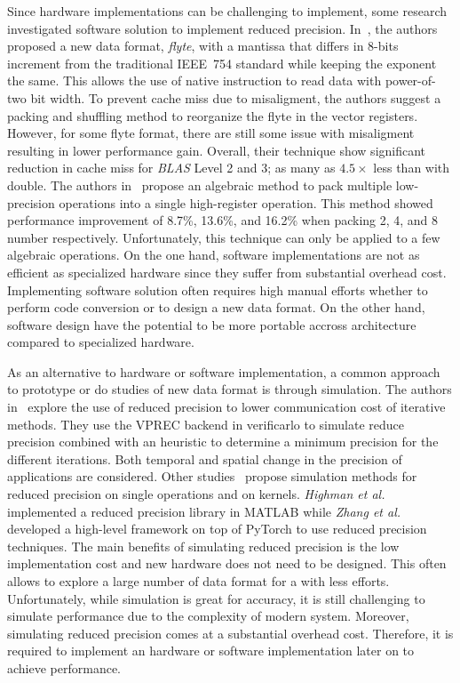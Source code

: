 Since hardware implementations can be challenging to implement, some research investigated
software solution to implement reduced precision.
In~\cite{Anderson2016-yn}, the authors proposed a new data format, \textit{flyte},
with a mantissa that differs in 8-bits increment from the traditional IEEE~754 
standard while keeping the exponent the same.
This allows the use of native instruction to read data with power-of-two bit width.
To prevent cache miss due to misaligment, the authors suggest a packing and shuffling
method to reorganize the flyte in the vector registers.
However, for some flyte format, there are still some issue with misaligment resulting
in lower performance gain.
Overall, their technique show significant reduction in cache miss for \textit{BLAS}
Level 2 and 3; as many as $4.5\times$ less than with double.
The authors in~\cite{Zucker1994-rg} propose an algebraic method to pack multiple
low-precision operations into a single high-register operation.
This method showed performance improvement of 8.7\%, 13.6\%, and 16.2\% when packing
2, 4, and 8 number respectively.
Unfortunately, this technique can only be applied to a few algebraic operations.
On the one hand, software implementations are not as efficient as specialized hardware
since they suffer from substantial overhead cost.
Implementing software solution often requires high manual efforts whether to  perform
code conversion or to design a new data format.
On the other hand, software design have the potential to be more portable accross
architecture compared to specialized hardware.

As an alternative to hardware or software implementation, a common approach to 
prototype or do studies of new data format is through simulation.
The authors in~\cite{Chatelain2019-fu} explore the use of reduced precision to 
lower communication cost of iterative methods.
They use the VPREC backend in verificarlo to simulate reduce precision combined
with an heuristic to determine a minimum precision for the different iterations.
Both temporal and spatial change in the precision of applications are considered.
Other studies~\cite{Higham2019-yd,Zhang2019-xv} propose simulation methods for reduced
precision on single operations and on kernels.
\textit{Highman et al.} implemented a reduced precision library in MATLAB while 
\textit{Zhang et al.} developed a high-level framework on top of PyTorch to use
reduced precision techniques.
The main benefits of simulating reduced precision is the low implementation cost 
and new hardware does not need to be designed.
This often allows to explore a large number of data format for a with less efforts.
Unfortunately, while simulation is great for accuracy, it is still challenging to 
simulate performance due to the complexity of modern system.
Moreover, simulating reduced precision comes at a substantial overhead cost.
Therefore, it is required to implement an hardware or software implementation later on to achieve performance.

